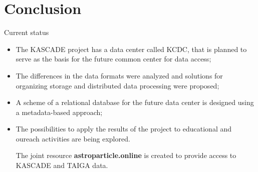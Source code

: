 \section{Conclusion}

\begin{frame}{Current status}
  \begin{itemize}
    \item The KASCADE project has a data center called KCDC, that is planned to serve as the basis for the future common center for data access;
    \item The differences in the data formats were analyzed and solutions for organizing storage and distributed data processing were proposed;
    \item A scheme of a relational database for the future data center is designed using a metadata-based approach;
  \item The possibilities to apply the results of the project to educational and oureach activities are being explored.

    The joint resource \textbf{\textcolor{kit-green100}{astroparticle.online}} is created to provide access to KASCADE and TAIGA data.
  \end{itemize}
\end{frame}

